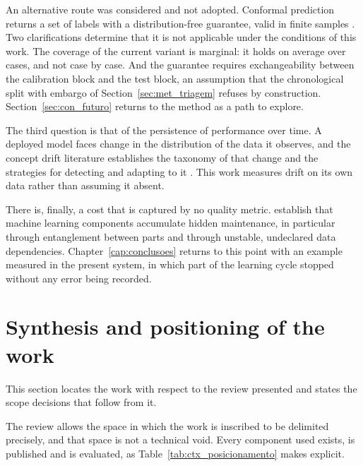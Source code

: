 An alternative route was considered and not adopted. Conformal prediction returns a set of labels
with a distribution-free guarantee, valid in finite samples \autocite{vovk2005algorithmic,
angelopoulos2023conformal}. Two clarifications determine that it is not applicable under the
conditions of this work. The coverage of the current variant is marginal: it holds on average over
cases, and not case by case. And the guarantee requires exchangeability between the calibration
block and the test block, an assumption that the chronological split with embargo of
Section~\ref{sec:met_triagem} refuses by construction. Section~\ref{sec:con_futuro} returns to the
method as a path to explore.

The third question is that of the persistence of performance over time. A deployed model faces
change in the distribution of the data it observes, and the concept drift literature establishes
the taxonomy of that change and the strategies for detecting and adapting to it
\autocite{gama2014survey}. This work measures drift on its own data rather than assuming it absent.

There is, finally, a cost that is captured by no quality metric. \textcite{sculley2015debt}
establish that machine learning components accumulate hidden maintenance, in particular through
entanglement between parts and through unstable, undeclared data dependencies.
Chapter~\ref{cap:conclusoes} returns to this point with an example measured in the present system,
in which part of the learning cycle stopped without any error being recorded.

\section{Synthesis and positioning of the work}
\label{sec:ctx_sintese}

This section locates the work with respect to the review presented and states the scope decisions
that follow from it.

The review allows the space in which the work is inscribed to be delimited precisely, and that
space is not a technical void. Every component used exists, is published and is evaluated, as
Table~\ref{tab:ctx_posicionamento} makes explicit.

